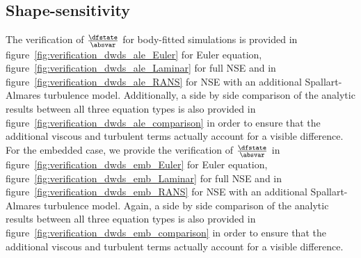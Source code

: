 \documentclass[../main.tex]{subfiles}
\begin{document}
\FloatBarrier



\subsection{Shape-sensitivity}\label{sec:verification_dwds_shape}
The verification of $\tfrac{\dfstate}{\absvar}$ for body-fitted simulations is provided in figure~\ref{fig:verification_dwds_ale_Euler} for Euler equation, figure~\ref{fig:verification_dwds_ale_Laminar} for full \ac{NSE} and in figure~\ref{fig:verification_dwds_ale_RANS} for \ac{NSE} with an additional Spallart-Almares turbulence model.
Additionally, a side by side comparison of the analytic results between all three equation types is also provided in figure~\ref{fig:verification_dwds_ale_comparison} in order to ensure that the additional viscous and turbulent terms actually account for a visible difference.
\\
For the embedded case, we provide the verification of $\tfrac{\dfstate}{\absvar}$  in figure~\ref{fig:verification_dwds_emb_Euler} for Euler equation, figure~\ref{fig:verification_dwds_emb_Laminar} for full \ac{NSE} and in figure~\ref{fig:verification_dwds_emb_RANS} for \ac{NSE} with an additional Spallart-Almares turbulence model.
Again, a side by side comparison of the analytic results between all three equation types is also provided in figure~\ref{fig:verification_dwds_emb_comparison} in order to ensure that the additional viscous and turbulent terms actually account for a visible difference.
\end{document}
